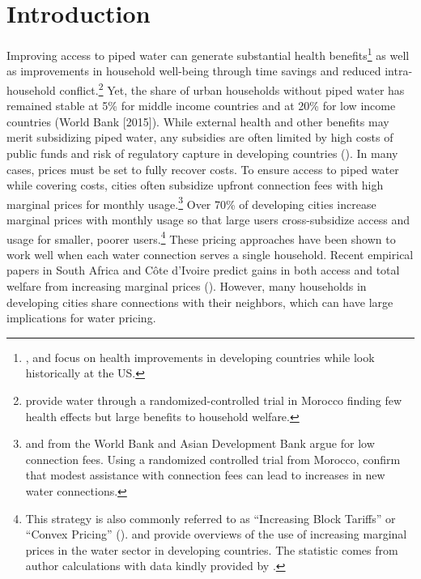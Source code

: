 \documentclass[12pt]{article}
\begin{document}
\section{Introduction}
Improving access to piped water can generate substantial health benefits\footnote{\cite{zhang2016long,kosec2014child,gamper2010impact}, and \cite{galiani2005water} focus on health improvements in developing countries while \cite{cutler2005role} look historically at the US.} as well as improvements in household well-being through time savings and reduced intra-household conflict.\footnote{\cite{devoto2012happiness} provide water through a randomized-controlled trial in Morocco finding few health effects but large benefits to household welfare.}  Yet, the share of urban households without piped water has remained stable at 5\% for middle income countries and at 20\% for low income countries (World Bank [2015]).  While external health and other benefits may merit subsidizing piped water, any subsidies are often limited by high costs of public funds and risk of regulatory capture in developing countries (\cite{laffont2005regulation}).  In many cases, prices must be set to fully recover costs.  To ensure access to piped water while covering costs, cities often subsidize upfront connection fees with high marginal prices for monthly usage.\footnote{\cite{mcintosh2003asian} and \cite{komives2006distributional} from the World Bank and Asian Development Bank argue for low connection fees.  Using a randomized controlled trial from Morocco, \cite{devoto2012happiness} confirm that modest assistance with connection fees can lead to increases in new water connections.}  Over 70\% of developing cities increase marginal prices with monthly usage so that large users cross-subsidize access and usage for smaller, poorer users.\footnote{This strategy is also commonly referred to as ``Increasing Block Tariffs'' or  ``Convex Pricing'' (\cite{borenstein2012redistributional}). \cite{hoque2013state} and \cite{boland2000political} provide overviews of the use of increasing marginal prices in the water sector in developing countries.  The statistic comes from author calculations with data kindly provided by \cite{hoque2013state}.}  These pricing approaches have been shown to work well when each water connection serves a single household.  Recent empirical papers in South Africa and C{\^o}te d'Ivoire predict gains in both access and total welfare from increasing marginal prices (\cite{szabo2015value,diakite2009proposal}).  However, many households in developing cities share connections with their neighbors, which can have large implications for water pricing.  
\end{document}
